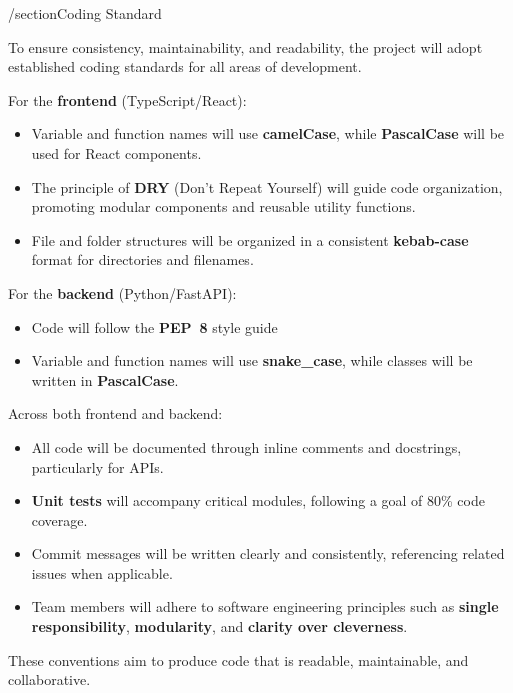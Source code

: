 \documentclass{article}
\begin{document}

/section{Coding Standard}

To ensure consistency, maintainability, and readability, the project will adopt
established coding standards for all areas of development.

For the \textbf{frontend} (TypeScript/React):
\begin{itemize}

\item Variable and function names will use \textbf{camelCase}, while
  \textbf{PascalCase} will be used for React components.
  \item The principle of \textbf{DRY} (Don’t Repeat Yourself) will guide code
  organization, promoting modular components and reusable utility functions.
  \item File and folder structures will be organized in a consistent
  \textbf{kebab-case} format for directories and filenames.
\end{itemize}

For the \textbf{backend} (Python/FastAPI):
\begin{itemize}
  \item Code will follow the \textbf{PEP~8} style guide
  \item Variable and function names will use \textbf{snake\_case}, while classes
  will be written in \textbf{PascalCase}.
\end{itemize}

Across both frontend and backend:
\begin{itemize}
  \item All code will be documented through inline comments and docstrings,
  particularly for APIs.
  \item \textbf{Unit tests} will accompany critical modules, following a goal of
  80\% code coverage.
  \item Commit messages will be written clearly and consistently, referencing
  related issues when applicable.
  \item Team members will adhere to software engineering principles such as
  \textbf{single responsibility}, \textbf{modularity}, and \textbf{clarity over
  cleverness}.
\end{itemize}

These conventions aim to produce code that is readable, maintainable, and
collaborative.

\end{document}
